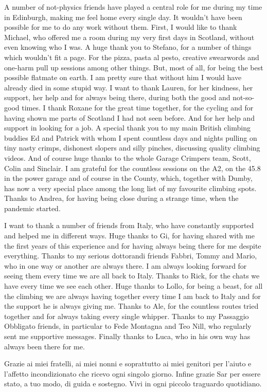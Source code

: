 A number of not-physics friends have played a central role for me during my time in Edinburgh,
making me feel home every single day. It wouldn't have been possible for me to do any work without them.
First, I would like to thank Michael, who offered me a room during my very first days in Scotland, without even knowing 
who I was.
% 
A huge thank you to Stefano, for a number of things which wouldn't fit a page. For the pizza, pasta al pesto,
creative swearwords and one-harm pull up sessions among other things. 
But, most of all, for being the best possible flatmate on earth.
I am pretty sure that without him I would have already died in some stupid way. 
%
I want to thank Lauren, for her kindness, her support, her help and for always being there, during
both the good and not-so-good times.  
I thank Roxane for the great time together, for the cycling and for having shown me parts of Scotland 
I had not seen before. And for her help and support in looking for a job. 
%
A special thank you to my main British climbing buddies Ed and Patrick with whom I spent countless days and nights
pulling on tiny nasty crimps, dishonest slopers and silly pinches, discussing quality climbing videos.
And of course huge thanks to the whole Garage Crimpers team,
Scott, Colin and Sinclair. I am grateful for the countless sessions on the A2, on the 45.8 in the power garage 
and of course in the County, which, together with Dumby, has now a very special place among the long list of my
favourite climbing spots. 
%
Thanks to Andrea, for having being close during a strange time, when the pandemic started.

%   
I want to thank a number of friends from Italy, who have constantly supported and helped me in different ways.
Huge thanks to Gi, for having shared with me the first years of this experience and for having always being there for me
despite everything.
Thanks to my serious dottorandi friends Fabbri, Tommy and Mario, who in one way or another are always there.
I am always looking forward for seeing them every time we are all back to Italy.
Thanks to Rick, for the chats we have every time we see each other.
Huge thanks to Lollo, for being a beast, for all the climbing we are always having together every time
I am back to Italy and for the support he is always giving me.
Thanks to Ale, for the countless routes tried together and for always taking every single whipper.
Thanks to my Passaggio Obbligato friends, in particular to Fede Montagna and Teo Nill, who 
regularly sent me supportive messages. 
Finally thanks to Luca, who in his own way has always been there for me.

Grazie ai miei fratelli, ai miei nonni e soprattutto ai miei genitori per l'aiuto e l'affetto incondizionato
che ricevo ogni singolo giorno. 
Infine grazie Sar per essere stato, a tuo modo, di guida e sostegno. Vivi in ogni piccolo traguardo quotidiano.

\blankpage
 




